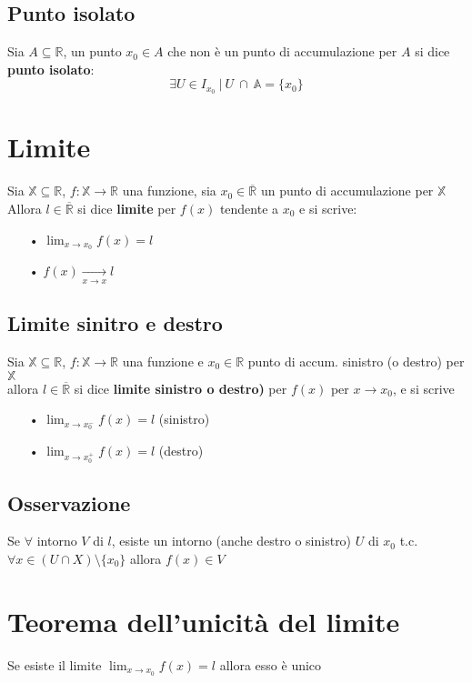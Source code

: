 \subsection{Punto isolato}
Sia $A \subseteq \mathbb{R}$, un punto $x_0 \in A$ che non \`e un punto di accumulazione per $A$ si dice \textbf{punto isolato}:	
\begin{equation}
\exists U \in I_{x_0}\ |\ U\ \cap\ \mathbb{A} = \{x_0\}
\end{equation}

\section{Limite}
Sia $\mathbb{X} \subseteq \mathbb{R}$, $f:\mathbb{X} \rightarrow \mathbb{R}$ una funzione, sia $x_0 \in \overline{\mathbb{R}}$ un punto di accumulazione per $\mathbb{X}$ \\
Allora $l \in \overline{\mathbb{R}}$ si dice \textbf{limite} per $f(x)$ tendente a $x_0$ e si scrive:
\begin{enumerate}
\item[•] $\displaystyle \lim_{x \to x_0}f(x) = l$
\item[•] $\displaystyle f(x) \xrightarrow[x \to x]{} l$
\end{enumerate}
\subsection{Limite sinitro e destro}
Sia $\mathbb{X} \subseteq \mathbb{R}$, $f:\mathbb{X} \rightarrow \mathbb{R}$ una funzione e $x_0 \in \mathbb{R}$ punto di accum. sinistro (o destro) per $\mathbb{X}$ \\
allora $l \in \overline{\mathbb{R}}$ si dice \textbf{limite sinistro o destro)} per $f(x)$ per $x \to x_0$, e si scrive \\
\begin{enumerate}
\item[•] $\displaystyle \lim_{x \to x_0^-}f(x) = l$ (sinistro)
\item[•] $\displaystyle \lim_{x \to x_0^+}f(x) = l$ (destro)\end{enumerate}
\subsection{Osservazione}
Se $\forall$ intorno $V$ di $l$, esiste un intorno (anche destro o sinistro) $U$ di $x_0$ t.c. $\forall x \in (U \cap X) \setminus \{x_0\}$ allora $f(x) \in V$

\section{Teorema dell'unicità del limite}
Se esiste il limite $\displaystyle \lim_{x \to x_0}f(x) = l$ allora esso è unico
